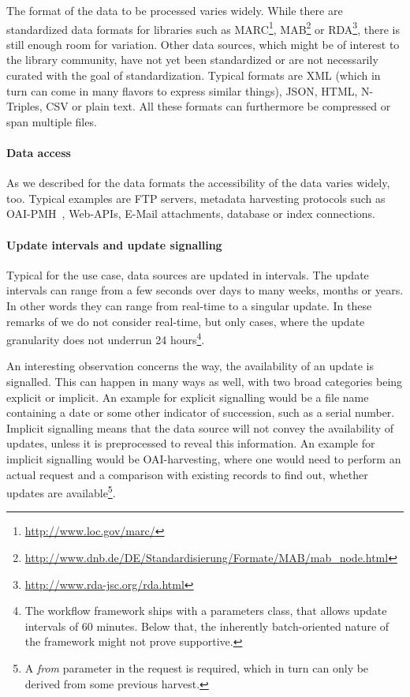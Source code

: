 \documentclass[english]{lni}
\begin{document}
    The format of the data to be processed varies widely. While there are standardized data
    formats for libraries such as MARC\footnote{\url{http://www.loc.gov/marc/}},
    MAB\footnote{\url{http://www.dnb.de/DE/Standardisierung/Formate/MAB/mab_node.html}} or RDA\footnote{\url{http://www.rda-jsc.org/rda.html}},
    there is still enough room for variation. Other data sources, which
    might be of interest to the library community, have not yet been
    standardized or are not necessarily curated with the goal of standardization.
    Typical formats are XML (which in turn can come in many flavors to
    express similar things), JSON, HTML, N-Triples, CSV or plain text. All
    these formats can furthermore be compressed or span multiple files.

    \paragraph{Data access} As we described for the data formats the accessibility of the data varies widely, too.
    Typical examples are FTP servers, metadata harvesting protocols such as
    OAI-PMH~\cite{oai2008}, Web-APIs, E-Mail attachments, database or index
    connections.

    \paragraph{Update intervals and update signalling}
    \label{updates}

    Typical for the use case, data sources are updated in intervals.
    The update intervals can range from a
    few seconds over days to many weeks, months or years. In other words
    they can range from real-time to a singular update.
    In these remarks of we do not consider real-time, but only cases, where
    the update granularity does not underrun 24 hours\footnote{The workflow
    framework ships with a parameters class, that allows update intervals of 60 minutes. Below
    that, the inherently batch-oriented nature of the framework might not prove supportive.}.

    An interesting observation concerns the way, the availability of an update
    is signalled. This can happen in many ways as well, with two broad categories being explicit or implicit.
    An example for explicit signalling would be a file name containing a date
    or some other indicator of succession, such as a serial number. Implicit
    signalling means that the data source will not convey the
    availability of updates, unless it is preprocessed to
    reveal this information. An example for implicit signalling would be
    OAI-harvesting, where one would need to perform an actual request and a
    comparison with existing records to find out, whether updates are available\footnote{A \emph{from} parameter in the request is required, which in turn can only be derived from some previous harvest.}.
\end{document}
